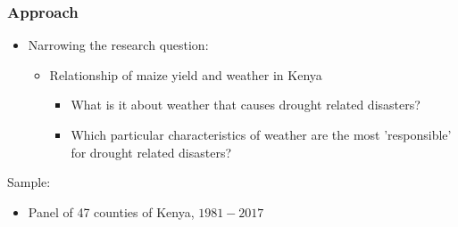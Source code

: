 \documentclass{beamer}              %
\begin{document}
\begin{frame}\label{Approach}
\frametitle{Approach} 

\begin{itemize}
\item Narrowing the research question:
\begin{itemize}
\item Relationship of maize yield and weather in Kenya
\begin{itemize}
\item What is it about weather that causes drought related disasters?
\item Which particular characteristics of weather are the most 'responsible' for drought related disasters?
\end{itemize}
\end{itemize}
\end{itemize}

Sample:
\begin{itemize}
\item Panel of 47 counties of Kenya, $1981-2017$
\end{itemize}

\end{frame}


\end{document}
